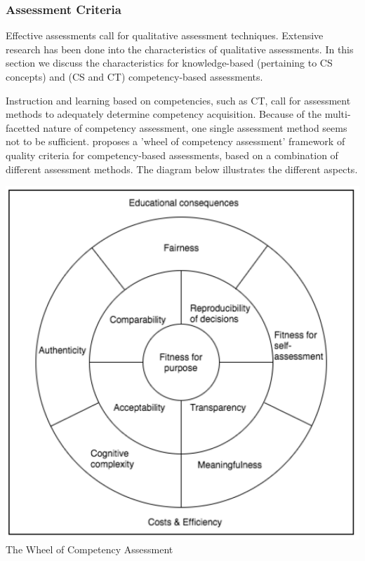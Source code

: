 \subsubsection*{Assessment Criteria}\label{sec:qualityCriteria}
Effective assessments call for qualitative assessment techniques. Extensive research has been done into the characteristics of qualitative assessments. In this section we discuss the characteristics for knowledge-based (pertaining to CS concepts) and (CS and CT) competency-based assessments.


Instruction and learning based on competencies, such as CT, call for assessment methods to adequately determine competency acquisition. Because of the multi-facetted nature of competency assessment, one single assessment method seems not to be sufficient.  proposes a 'wheel of competency assessment' framework of quality criteria for competency-based assessments, based on a combination of different assessment methods. The diagram below illustrates the different aspects.


%

\begin{center}
\includegraphics[scale=0.6]{figures/AdaptedQualityCriteriaCatete.png}\newline
The Wheel of Competency Assessment \cite{baartman2006wheel}\label{fig:AssQualityCriteria}
\end{center}


